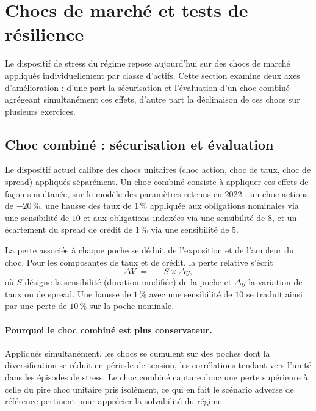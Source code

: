 \documentclass[11pt,a4paper]{article}
\begin{document}
\section{Chocs de marché et tests de résilience}

Le dispositif de stress du régime repose aujourd'hui sur des chocs de marché appliqués individuellement par classe d'actifs. Cette section examine deux axes d'amélioration : d'une part la sécurisation et l'évaluation d'un choc combiné agrégeant simultanément ces effets, d'autre part la déclinaison de ces chocs sur plusieurs exercices.

\subsection{Choc combiné : sécurisation et évaluation}

Le dispositif actuel calibre des chocs unitaires (choc action, choc de taux, choc de spread) appliqués séparément. Un choc combiné consiste à appliquer ces effets de façon simultanée, sur le modèle des paramètres retenus en 2022 : un choc actions de $-20\,\%$, une hausse des taux de $1\,\%$ appliquée aux obligations nominales via une sensibilité de $10$ et aux obligations indexées via une sensibilité de $8$, et un écartement du spread de crédit de $1\,\%$ via une sensibilité de $5$.

\begin{definitionbox}
La perte associée à chaque poche se déduit de l'exposition et de l'ampleur du choc. Pour les composantes de taux et de crédit, la perte relative s'écrit
\[
\Delta V \;=\; -\,S \times \Delta y,
\]
où $S$ désigne la sensibilité (duration modifiée) de la poche et $\Delta y$ la variation de taux ou de spread. Une hausse de $1\,\%$ avec une sensibilité de $10$ se traduit ainsi par une perte de $10\,\%$ sur la poche nominale.
\end{definitionbox}

\paragraph{Pourquoi le choc combiné est plus conservateur.} Appliqués simultanément, les chocs se cumulent sur des poches dont la diversification se réduit en période de tension, les corrélations tendant vers l'unité dans les épisodes de stress. Le choc combiné capture donc une perte supérieure à celle du pire choc unitaire pris isolément, ce qui en fait le scénario adverse de référence pertinent pour apprécier la solvabilité du régime.
\end{document}
